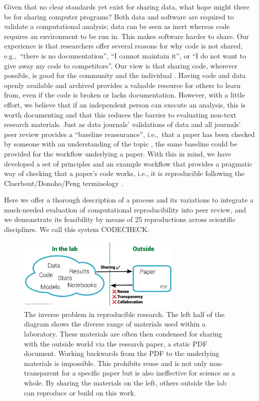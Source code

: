 \documentclass[12pt]{article}
\begin{document}
Given that no clear standards yet exist for sharing data, what hope might there be for sharing computer programs?
Both data and software are required to validate a
computational analysis; data can be seen as inert whereas
code requires an environment to be run in.
This makes software harder to share.
Our experience is that researchers offer several reasons for why code
is not shared, e.g.,~``there is no documentation'', ``I cannot maintain it'', or ``I do not want to give away my code to competitors''.
Our view is that sharing code, wherever possible, is good for the community and the individual \cite{Barnes2010-iv,markowetz_five_2015}.
Having code and data openly available and archived provides a valuable
resource for others to learn from, even if the code is broken or lacks documentation.
However, with a little effort, we believe that if an independent person can execute an analysis, this is worth documenting and that this  reduces the barrier to evaluating non-text research materials.
Just as data journals' validations of data and all journals' peer review  provides a ``baseline reassurance'', i.e.,~that a paper has been checked by someone with an understanding of the topic \cite{fyfe_mission_2019}, the same baseline could be provided for the workflow underlying a paper.
With this in mind, we have developed a set of principles and an example workflow that provides a pragmatic way of checking that a paper's code works, i.e., it is reproducible following the Claerbout/Donoho/Peng terminology \cite{barba_terminologies_2018}.

Here we offer a thorough description of a process and its variations to integrate a much-needed evaluation of computational reproducibility into peer review, and we demonstrate its feasibility by means of 25 reproductions across scientific disciplines.
We call this system CODECHECK.

\begin{figure}
  \centering
  \includegraphics[width=0.7\textwidth]{figs/rr.pdf}
  \caption{The inverse problem in reproducible research. The left
  half of the diagram shows the diverse range of materials used
  within a laboratory. These materials are often then
  condensed for sharing with the outside world via the
  research paper, a static PDF document. Working backwards from the
  PDF to the underlying materials is impossible. This prohibits reuse
  and is not only non-transparent for a specific paper but is also 
  ineffective for science as a whole. By sharing the
  materials on the left, others outside the lab can reproduce
  or build on this work.}
  \label{fig:inverse}
\end{figure}
\end{document}
